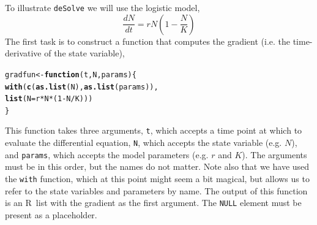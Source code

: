 \documentclass[11pt]{article}\usepackage[]{graphicx}\usepackage[]{color}
\makeatletter
\newcommand{\hlnum}[1]{\textcolor[rgb]{0.686,0.059,0.569}{#1}}%
\newcommand{\hlopt}[1]{\textcolor[rgb]{0,0,0}{#1}}%
\newcommand{\hlstd}[1]{\textcolor[rgb]{0.345,0.345,0.345}{#1}}%
\newcommand{\hlkwa}[1]{\textcolor[rgb]{0.161,0.373,0.58}{\textbf{#1}}}%
\newcommand{\hlkwb}[1]{\textcolor[rgb]{0.69,0.353,0.396}{#1}}%
\newcommand{\hlkwc}[1]{\textcolor[rgb]{0.333,0.667,0.333}{#1}}%
\newcommand{\hlkwd}[1]{\textcolor[rgb]{0.737,0.353,0.396}{\textbf{#1}}}%
\newenvironment{kframe}{%
 \def\at@end@of@kframe{}%
 \ifinner\ifhmode%
  \def\at@end@of@kframe{\end{minipage}}%
  \begin{minipage}{\columnwidth}%
 \fi\fi%
 \def\FrameCommand##1{\hskip\@totalleftmargin \hskip-\fboxsep
 \colorbox{shadecolor}{##1}\hskip-\fboxsep
     \hskip-\linewidth \hskip-\@totalleftmargin \hskip\columnwidth}%
 \MakeFramed {\advance\hsize-\width
   \@totalleftmargin\z@ \linewidth\hsize
   \@setminipage}}%
 {\par\unskip\endMakeFramed%
 \at@end@of@kframe}
\newenvironment{knitrout}{}{} %
\newcommand{\code}[1]{{\tt #1}}
\newcommand\R{{\sf R}}
\numberwithin{exercise}{section}
\makeatother
\begin{document}
To illustrate \code{deSolve} we will use the logistic model,
\begin{equation}
  \label{eq:1}
  \frac{dN}{dt} = rN\left(1-\frac{N}{K}\right)
\end{equation}
The first task is to construct a function that computes the gradient
(i.e. the time-derivative of the state variable),
\begin{knitrout}
\color{fgcolor}\begin{kframe}
\begin{alltt}
\hlstd{gradfun} \hlkwb{<-} \hlkwa{function}\hlstd{(}\hlkwc{t}\hlstd{,} \hlkwc{N}\hlstd{,} \hlkwc{params}\hlstd{) \{}
    \hlkwd{with}\hlstd{(}\hlkwd{c}\hlstd{(}\hlkwd{as.list}\hlstd{(N),} \hlkwd{as.list}\hlstd{(params)),}
         \hlkwd{list}\hlstd{(}\hlkwc{N} \hlstd{= r} \hlopt{*} \hlstd{N} \hlopt{*} \hlstd{(}\hlnum{1} \hlopt{-} \hlstd{N}\hlopt{/}\hlstd{K)))}
\hlstd{\}}
\end{alltt}
\end{kframe}
\end{knitrout}
\noindent This function takes three arguments, \code{t}, which accepts
a time point at which to evaluate the differential equation, \code{N},
which accepts the state variable (e.g. $N$), and \code{params}, which
accepts the model parameters (e.g. $r$ and $K$).  The arguments must
be in this order, but the names do not matter.  Note also that we have
used the \code{with} function, which at this point might seem a bit
magical, but allows us to refer to the state variables and parameters
by name.  The output of this function is an \R\ list with the gradient
as the first argument.  The \code{NULL} element must be present as a
placeholder.
\end{document}
